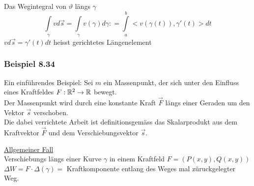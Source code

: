 \begin{definition}{8.33}
Das Wegintegral von $\vartheta$ längs $\gamma$
\[\int\limits_\gamma  {vd\vec s}  = \int\limits_\gamma  {v(\gamma )d\gamma : = \int\limits_a^b { < v\left( {\gamma \left( t \right)} \right),\gamma '(t) > dt} } \] ${vd\vec s}=\gamma'(t)dt$ heisst gerichtetes Längenelement
\end{definition}
\subsubsection*{Beispiel 8.34}
Ein einführendes Beispiel: Sei $m$ ein Massenpunkt, der sich unter den Einfluss eines Kraftfeldes $F:\mathbb{R}^2\to\mathbb{R}$ bewegt.\\

Der Massenpunkt wird durch eine konstante Kraft $\overrightarrow F $ längs einer Geraden um den Vektor $\vec s$ verschoben. \\

Die dabei verrichtete Arbeit ist definitionsgemäss das Skalarprodukt aus dem Kraftvektor $\overrightarrow F $ und dem Verschiebungsvektor $\vec s$.

\noindent\underline{Allgemeiner Fall}\\
Verschiebungs längs einer Kurve $\gamma$ in einem Kraftfeld $F=\left( P(x,y),Q(x,y)\right)$
$\Delta W= F\cdot \Delta (\gamma)=$ Kraftkomponente entlang des Weges mal züruckgelegter Weg. \\

